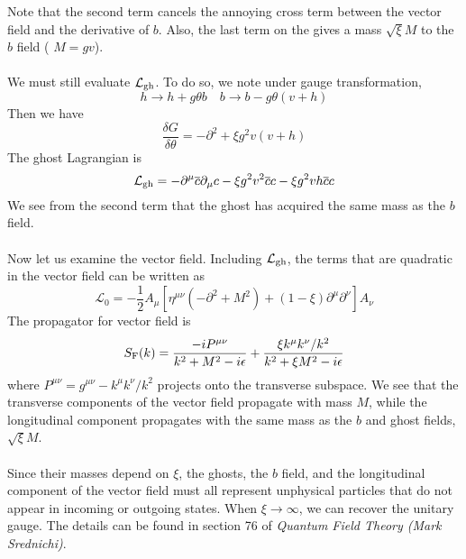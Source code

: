 Note that the second term cancels the annoying cross term between the vector field and the derivative of $b$. Also, the last term on the gives a mass $\sqrt{\xi}M$ to the $b$ field ( $M = gv$).
\\ \\
We must still evaluate $\mathcal{L}_{\rm gh}$. To do so, we note under gauge transformation,
\[h \to h + g\theta b \quad b \to b - g\theta(v+h)\]
Then we have
\[\frac{\delta G}{\delta \theta} = -\partial^2 + \xi g^2 v(v+h)\]
The ghost Lagrangian is
\[\mathcal{L}_{\rm gh} = -\partial^{\mu}\overline{c}\partial_{\mu}c - \xi g^2v^2\overline{c}c - \xi g^2 vh\overline{c}c\]
We see from the second term that the ghost has acquired the same mass as the $b$ field.
\\ \\
Now let us examine the vector field. Including $\mathcal{L}_{\rm gh}$, the terms that are quadratic in the vector field can be written as
\[\mathcal{L}_0 = - \frac{1}{2}A_{\mu} \left[ \eta^{\mu\nu}(-\partial^2 + M^2) + (1 - \xi)\partial^{\mu}\partial^{\nu} \right] A_{\nu}\]
The propagator for vector field is
\[S_{\rm F}(k) = \frac{-iP^{\mu\nu}}{k^2+M^2-i\epsilon} + \frac{\xi k^{\mu}k^{\nu}/k^2}{k^2+ \xi M^2-i\epsilon}\]
where $P^{\mu\nu} = g^{\mu\nu} - k^{\mu}k^{\nu}/k^2$ projects onto the transverse subspace. We see that the transverse components of the vector field propagate with mass $M$, while the longitudinal component propagates with the same mass as the $b$ and ghost fields, $\sqrt{\xi}M$.
\\ \\
Since their masses depend on $\xi$, the ghosts, the $b$ field, and the longitudinal component of the vector field must all represent unphysical particles that do not appear in incoming or outgoing states. When $\xi \to \infty$, we can recover the unitary gauge. The details can be found in section 76 of \emph{Quantum Field Theory (Mark Srednichi)}.

